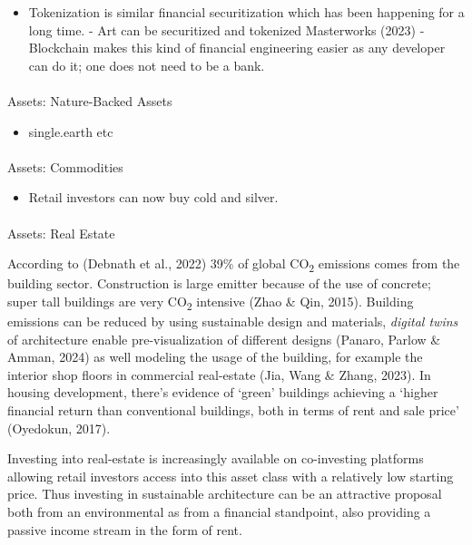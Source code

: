 \documentclass[
  letterpaper,
  DIV=11,
  numbers=noendperiod]{scrartcl}
\makeatletter
\let\oldparagraph\paragraph
\renewcommand{\paragraph}{
    \@ifstar
      \xxxParagraphStar
      \xxxParagraphNoStar
  }
\newcommand{\xxxParagraphStar}[1]{\oldparagraph*{#1}\mbox{}}
\newcommand{\xxxParagraphNoStar}[1]{\oldparagraph{#1}\mbox{}}
\providecommand{\tightlist}{%
  \setlength{\itemsep}{0pt}\setlength{\parskip}{0pt}}\usepackage{longtable,booktabs,array}
\makeatother
\begin{document}
\begin{itemize}
\tightlist
\item
  Tokenization is similar financial securitization which has been
  happening for a long time. - Art can be securitized and tokenized
  Masterworks (2023) - Blockchain makes this kind of financial
  engineering easier as any developer can do it; one does not need to be
  a bank.
\end{itemize}

\paragraph{Assets: Nature-Backed
Assets}\label{assets-nature-backed-assets}

\begin{itemize}
\tightlist
\item
  single.earth etc
\end{itemize}

\paragraph{Assets: Commodities}\label{assets-commodities}

\begin{itemize}
\tightlist
\item
  Retail investors can now buy cold and silver.
\end{itemize}

\paragraph{Assets: Real Estate}\label{assets-real-estate}

According to (Debnath et al., 2022) 39\% of global CO\textsubscript{2}
emissions comes from the building sector. Construction is large emitter
because of the use of concrete; super tall buildings are very
CO\textsubscript{2} intensive (Zhao \& Qin, 2015). Building emissions
can be reduced by using sustainable design and materials, \emph{digital
twins} of architecture enable pre-visualization of different designs
(Panaro, Parlow \& Amman, 2024) as well modeling the usage of the
building, for example the interior shop floors in commercial real-estate
(Jia, Wang \& Zhang, 2023). In housing development, there's evidence of
`green' buildings achieving a `higher financial return than conventional
buildings, both in terms of rent and sale price' (Oyedokun, 2017).

Investing into real-estate is increasingly available on co-investing
platforms allowing retail investors access into this asset class with a
relatively low starting price. Thus investing in sustainable
architecture can be an attractive proposal both from an environmental as
from a financial standpoint, also providing a passive income stream in
the form of rent.
\end{document}
